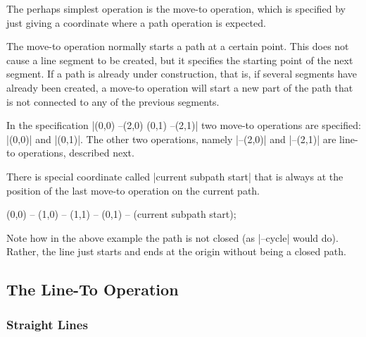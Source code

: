 The perhaps simplest operation is the move-to operation, which is specified by
just giving a coordinate where a path operation is expected.

\begin{pathoperation}[noindex]{}{}
    The move-to operation normally starts a path at a certain point. This does
    not cause a line segment to be created, but it specifies the starting point
    of the next segment. If a path is already under construction, that is, if
    several segments have already been created, a move-to operation will start
    a new part of the path that is not connected to any of the previous
    segments.
\begin{codeexample}[]
\end{codeexample}

    In the specification |(0,0) --(2,0) (0,1) --(2,1)| two move-to operations
    are specified: |(0,0)| and |(0,1)|. The other two operations, namely
    |--(2,0)| and |--(2,1)| are line-to operations, described next.
\end{pathoperation}

There is special coordinate called |current subpath start| that is always at
the position of the last move-to operation on the current path.
%
\begin{codeexample}[]
\tikz [line width=2mm]
  \draw (0,0) -- (1,0) -- (1,1)
        -- (0,1) -- (current subpath start);
\end{codeexample}

Note how in the above example the path is not closed (as |--cycle| would do).
Rather, the line just starts and ends at the origin without being a closed
path.


\subsection{The Line-To Operation}

\subsubsection{Straight Lines}

